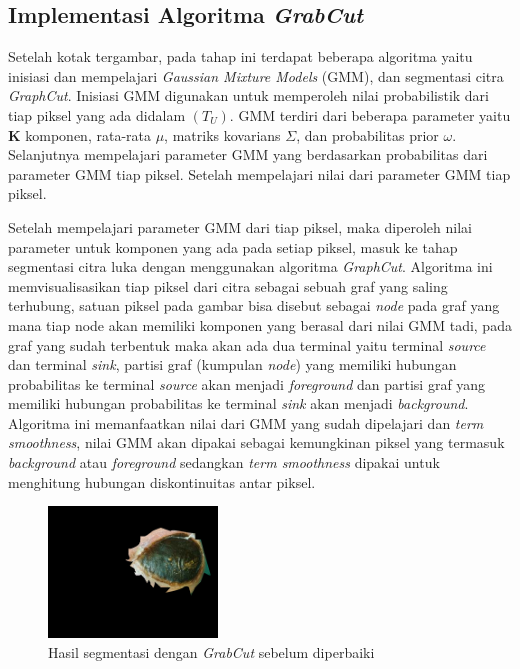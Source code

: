 \subsection{Implementasi Algoritma \emph{GrabCut}}
Setelah kotak tergambar, pada tahap ini terdapat beberapa algoritma yaitu inisiasi 
dan mempelajari \emph{Gaussian Mixture Models} (GMM), dan segmentasi citra \emph{GraphCut}. 
Inisiasi GMM digunakan untuk memperoleh nilai probabilistik dari tiap piksel yang ada
didalam \((T_{U})\). GMM terdiri dari beberapa parameter yaitu \textbf{K} komponen, 
rata-rata \(\mu\), matriks kovarians \(\Sigma\), dan probabilitas prior \(\omega\). 
Selanjutnya mempelajari parameter GMM yang berdasarkan probabilitas dari parameter 
GMM tiap piksel. Setelah mempelajari nilai dari parameter GMM tiap piksel.

Setelah mempelajari parameter GMM dari tiap piksel, maka diperoleh nilai parameter
untuk komponen yang ada pada setiap piksel, masuk ke tahap segmentasi citra luka 
dengan menggunakan algoritma \emph{GraphCut}. Algoritma ini memvisualisasikan tiap piksel 
dari citra sebagai sebuah graf yang saling terhubung, satuan piksel pada gambar bisa
disebut sebagai \emph{node} pada graf yang mana tiap node akan memiliki komponen yang 
berasal dari nilai GMM tadi, pada graf yang sudah terbentuk maka akan ada dua terminal
yaitu terminal \emph{source} dan terminal \emph{sink}, partisi graf (kumpulan \emph{node}) 
yang memiliki hubungan probabilitas ke terminal \emph{source} akan menjadi \emph{foreground}
dan partisi graf yang memiliki hubungan probabilitas ke terminal \emph{sink} akan
menjadi \emph{background}. Algoritma ini memanfaatkan nilai dari GMM yang sudah dipelajari dan \emph{term smoothness}, nilai GMM akan dipakai sebagai
kemungkinan piksel yang termasuk \emph{background} atau \emph{foreground} sedangkan 
\emph{term smoothness} dipakai untuk menghitung hubungan diskontinuitas antar piksel.

\begin{figure}[H]
	\centering{}
	\includegraphics[width=0.4\textwidth]{gambar/res_1.png}
	\caption{Hasil segmentasi dengan \emph{GrabCut} sebelum diperbaiki}
  \end{figure}

